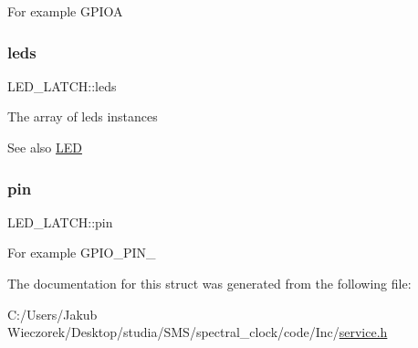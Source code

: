 For example G\+P\+I\+OA \mbox{\label{struct_l_e_d___l_a_t_c_h_a32d9a799b743577923e94ab791373192}} 
\subsubsection{\texorpdfstring{leds}{leds}}
{\footnotesize\ttfamily L\+E\+D\+\_\+\+L\+A\+T\+C\+H\+::leds}

The array of leds instances \begin{DoxySeeAlso}{See also}
\mbox{\hyperlink{struct_l_e_d}{L\+ED}} 
\end{DoxySeeAlso}
\mbox{\label{struct_l_e_d___l_a_t_c_h_a2697d547dbb223948a1d20456db05bef}} 
\subsubsection{\texorpdfstring{pin}{pin}}
{\footnotesize\ttfamily L\+E\+D\+\_\+\+L\+A\+T\+C\+H\+::pin}

For example G\+P\+I\+O\+\_\+\+P\+I\+N\+\_ 

The documentation for this struct was generated from the following file\+:\begin{DoxyCompactItemize}
\item 
C\+:/\+Users/\+Jakub Wieczorek/\+Desktop/studia/\+S\+M\+S/spectral\+\_\+clock/code/\+Inc/\mbox{\hyperlink{service_8h}{service.\+h}}\end{DoxyCompactItemize}

